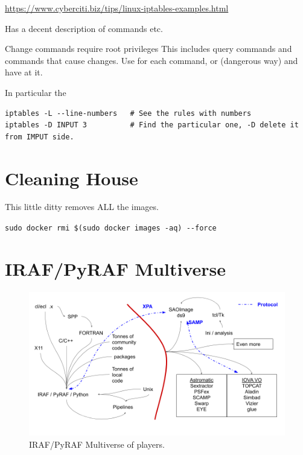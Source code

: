 \documentclass[letter,11pt,oneside]{article}
\newcommand{\dhl}[1]{{\color{verbcolor}{\texttt#1}}}
\begin{document}
\url{https://www.cyberciti.biz/tips/linux-iptables-examples.html}

Has a decent description of commands etc.

Change commands require root privileges This includes query commands
and commands that cause changes.  Use \dhl{sudo} for each command, or
\dhl{sudo -s} (dangerous way) and have at it.

In particular the

\begin{tcolorbox}[breakable]
\begingroup \fontsize{10pt}{10pt}
\selectfont
\begin{verbatim} 
iptables -L --line-numbers   # See the rules with numbers
iptables -D INPUT 3          # Find the particular one, -D delete it from IMPUT side.
\end{verbatim}
\endgroup
\end{tcolorbox}



\section{Cleaning House}

This little ditty removes ALL the images.


\verb=sudo docker rmi $(sudo docker images -aq) --force=



\section{IRAF/PyRAF Multiverse}

\begin{figure}[h!]
\centering
\includegraphics[width=\textwidth]{images/IRAFUniverse.png}
\caption[IRAF/PyRAF Multiverse]{IRAF/PyRAF Multiverse of players.} %
\label{figure:Multiverse}
\end{figure}
\clearpage
\end{document}
